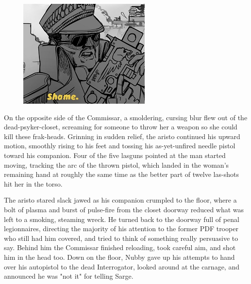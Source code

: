 \begin{figure}
	\begin{center}
		\includegraphics[width=\figwidth]{pics/21/98.png}
	\end{center}
\end{figure}
On the opposite side of the Commissar, a smoldering, cursing blur flew out of the dead-psyker-closet, screaming for someone to throw her a weapon so she could kill these frak-heads. 
Grinning in sudden relief, the aristo continued his upward motion, smoothly rising to his feet and tossing his as-yet-unfired needle pistol toward his companion. 
Four of the five lasguns pointed at the man started moving, tracking the arc of the thrown pistol, which landed in the woman's remaining hand at roughly the same time as the better part of twelve las-shots hit her in the torso.

The aristo stared slack jawed as his companion crumpled to the floor, where a bolt of plasma and burst of pulse-fire from the closet doorway reduced what was left to a smoking, steaming wreck. 
He turned back to the doorway full of penal legionnaires, directing the majority of his attention to the former PDF trooper who still had him covered, and tried to think of something really persuasive to say. 
Behind him the Commissar finished reloading, took careful aim, and shot him in the head too. 
Down on the floor, Nubby gave up his attempts to hand over his autopistol to the dead Interrogator, looked around at the carnage, and announced he was "not it" for telling Sarge.

